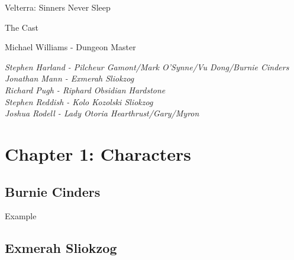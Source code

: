 \documentclass[letterpaper,10pt,twoside,twocolumn,openany]{book}
\begin{document}
\onecolumn

\begin{center}
Velterra: Sinners Never Sleep
\end{center}

\clearpage

\begin{center}
 
\Huge
The Cast\\
\vspace{20mm}

\large

Michael Williams - Dungeon Master

\vspace{10mm}
\normalsize
\textit{
Stephen Harland - Pilcheur Gamont/Mark O'Synne/Vu Dong/Burnie Cinders \\
Jonathan Mann - Exmerah Sliokzog\\
Richard Pugh - Riphard Obsidian Hardstone\\
Stephen Reddish - Kolo Kozolski Sliokzog\\
Joshua Rodell - Lady Otoria Hearthrust/Gary/Myron  \\
}

\end{center}

\clearpage

\twocolumn

\chapter{Chapter 1: Characters}

\section{Burnie Cinders}




\begin{paperbox}{Example}
  \lipsum[2]
\end{paperbox}



\clearpage


\section{Exmerah Sliokzog}
\end{document}
